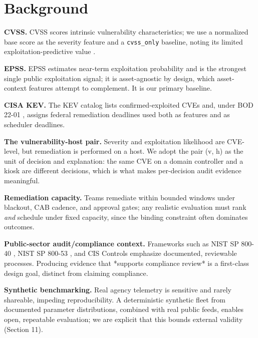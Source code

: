 \section{Background}

\textbf{CVSS.} CVSS \cite{first_cvss_v31} scores intrinsic vulnerability characteristics; we
use a normalized base score as the severity feature and a \texttt{cvss\_only} baseline,
noting its limited exploitation-predictive value \cite{allodi2014comparing}.

\textbf{EPSS.} EPSS \cite{jacobs2021epss} estimates near-term exploitation probability and is
the strongest single public exploitation signal; it is asset-agnostic by design,
which asset-context features attempt to complement. It is our primary baseline.

\textbf{CISA KEV.} The KEV catalog \cite{cisa_kev} lists confirmed-exploited CVEs and, under
BOD 22-01 \cite{cisa_bod2201}, assigns federal remediation deadlines used both as
features and as scheduler deadlines.

\textbf{The vulnerability-host pair.} Severity and exploitation likelihood are
CVE-level, but remediation is performed on a host. We adopt the pair (v, h) as the
unit of decision and explanation: the same CVE on a domain controller and a kiosk
are different decisions, which is what makes per-decision audit evidence
meaningful.

\textbf{Remediation capacity.} Teams remediate within bounded windows under blackout,
CAB cadence, and approval gates; any realistic evaluation must rank \textit{and} schedule
under fixed capacity, since the binding constraint often dominates outcomes.

\textbf{Public-sector audit/compliance context.} Frameworks such as NIST SP 800-40
\cite{nist80040r4}, NIST SP 800-53 \cite{nist80053r5}, and CIS Controls \cite{cis_controls_v8}
emphasize documented, reviewable processes. Producing evidence that *supports
compliance review* is a first-class design goal, distinct from claiming compliance.

\textbf{Synthetic benchmarking.} Real agency telemetry is sensitive and rarely
shareable, impeding reproducibility. A deterministic synthetic fleet from
documented parameter distributions, combined with real public feeds, enables open,
repeatable evaluation; we are explicit that this bounds external validity (Section
11).
